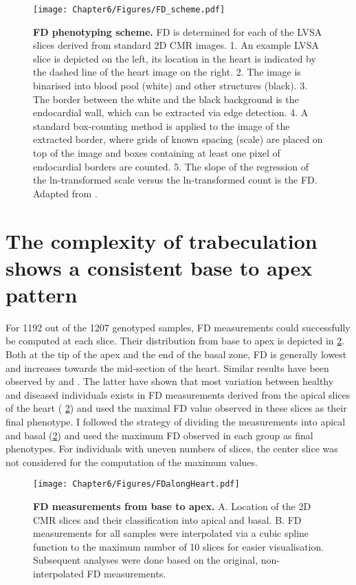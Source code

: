 \begin{figure}[hbtp]
	\centering
	\texttt{[image: Chapter6/Figures/FD\_scheme.pdf]}
	\caption[\textbf{FD phenotyping scheme. }]{\textbf{FD phenotyping scheme. }FD is determined for each of the LVSA slices derived from standard 2D CMR images. 1. An example LVSA slice is depicted on the left, its location in the heart is indicated by the dashed line of the heart image on the right. 2. The image is binarised into blood pool (white) and other structures (black). 3. The border between the white and the black background is the endocardial wall, which can be extracted via edge detection. 4. A standard box-counting method is applied to the image of the extracted border, where grids of known spacing (scale) are placed on top of the image and boxes containing at least one pixel of endocardial borders are counted. 5. The slope of the regression of the ln-transformed scale versus the ln-transformed count is the FD. Adapted from \citep{Captur2013}.} 
	 	\label{fig:scheme-fd}
\end{figure}

\section{The complexity of trabeculation shows a consistent base to apex pattern}
For \num{1192} out of the \num{1207} genotyped samples, FD measurements could successfully be computed at each slice. Their distribution from base to apex is depicted in \cref{fig:perslice-fd}. Both at the tip of the apex and the end of the basal zone, FD is generally lowest and increases towards the mid-section of the heart. Similar results have been observed by \citep{Kawel2012} and \citep{Captur2014}. The latter have shown that most variation between healthy and diseased individuals exists in FD measurements derived from the apical slices of the heart ( \cref{fig:perslice-fd}) and used the maximal FD value observed in these slices as their final phenotype. I followed the strategy of dividing the measurements into apical and basal (\cref{fig:perslice-fd}) and used the maximum FD observed in each group as final phenotypes. For individuals with uneven numbers of slices, the center slice was not considered for the computation of the maximum values.
\\
\begin{figure}[hbtp]
	\centering
	\texttt{[image: Chapter6/Figures/FDalongHeart.pdf]}
	\caption[\textbf{FD measurements from base to apex. }]{\textbf{FD measurements from base to apex. } A. Location of the 2D CMR slices and their classification into apical and basal. B. FD measurements for all samples were interpolated via a cubic spline function to the maximum number of \num{10} slices for easier visualisation. Subsequent analyses were done based on the original, non-interpolated FD measurements.} 
	 	\label{fig:perslice-fd}
\end{figure}

